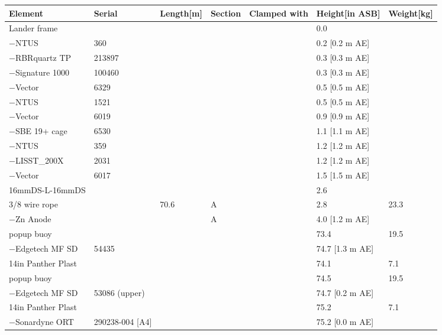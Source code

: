 \documentclass{article}
\begin{document}
\begin{tabularx}{\linewidth}{|l|l|l|l|l|l|l|}
\caption{L245 \textcolor{orange}{$\blacksquare$}: Assembly summary}\\
\hline
\textbf{Element} & \textbf{Serial} & \textbf{Length[m]} & \textbf{Section} & \textbf{Clamped with} & \textbf{Height[in ASB]} & \textbf{Weight[kg]} \\
\hline
Lander frame &  &  &  &  & 0.0 &  \\ \hline
$-$NTUS & 360 &  &  &  & 0.2 [0.2 m AE] &  \\ \hline
$-$RBRquartz TP & 213897 &  &  &  & 0.3 [0.3 m AE] &  \\ \hline
$-$Signature 1000 & 100460 &  &  &  & 0.3 [0.3 m AE] &  \\ \hline
$-$Vector & 6329 &  &  &  & 0.5 [0.5 m AE] &  \\ \hline
$-$NTUS & 1521 &  &  &  & 0.5 [0.5 m AE] &  \\ \hline
$-$Vector & 6019 &  &  &  & 0.9 [0.9 m AE] &  \\ \hline
$-$SBE 19+ cage & 6530 &  &  &  & 1.1 [1.1 m AE] &  \\ \hline
$-$NTUS & 359 &  &  &  & 1.2 [1.2 m AE] &  \\ \hline
$-$LISST\_200X & 2031 &  &  &  & 1.2 [1.2 m AE] &  \\ \hline
$-$Vector & 6017 &  &  &  & 1.5 [1.5 m AE] &  \\ \hline
16mmDS-L-16mmDS &  &  &  &  & 2.6 &  \\ \hline
3/8 wire rope &  & 70.6 & A &  & 2.8 & 23.3 \\ \hline
$-$Zn Anode &  &  & A &  & 4.0 [1.2 m AE] &  \\ \hline
popup buoy &  &  &  &  & 73.4 & 19.5 \\ \hline
$-$Edgetech MF SD & 54435 &  &  &  & 74.7 [1.3 m AE] &  \\ \hline
14in Panther Plast &  &  &  &  & 74.1 & 7.1 \\ \hline
popup buoy &  &  &  &  & 74.5 & 19.5 \\ \hline
$-$Edgetech MF SD & 53086 (upper) &  &  &  & 74.7 [0.2 m AE] &  \\ \hline
14in Panther Plast &  &  &  &  & 75.2 & 7.1 \\ \hline
$-$Sonardyne ORT & 290238-004 [A4] &  &  &  & 75.2 [0.0 m AE] &  \\ \hline
\end{tabularx}
\end{document}
